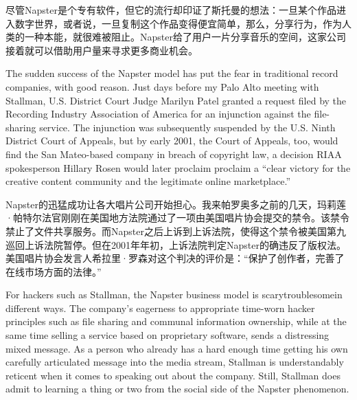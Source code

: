 \ifdefined\chs
尽管Napster是个专有软件，但它的流行却印证了斯托曼的想法：一旦某个作品进入数字世界，或者说，一旦复制这个作品变得便宜简单，那么，分享行为，作为人类的一种本能，就很难被阻止。Napster给了用户一片分享音乐的空间，这家公司接着就可以借助用户量来寻求更多商业机会。
\fi

\ifdefined\eng
The sudden success of the Napster model has put the fear in traditional record companies, with good reason. Just days before my Palo Alto meeting with Stallman, U.S. District Court Judge Marilyn Patel granted a request filed by the Recording Industry Association of America for an injunction against the file-sharing service. The injunction was subsequently suspended by the U.S. Ninth District Court of Appeals, but by early 2001, the Court of Appeals, too, would find the San Mateo-based company in breach of copyright law, a decision RIAA spokesperson Hillary Rosen would later proclaim \ifdefined\vone proclaim \fi a ``clear victory for the creative content community and the legitimate online marketplace.''
\fi

\ifdefined\chs
Napster的迅猛成功让各大唱片公司开始担心。我来帕罗奥多之前的几天，玛莉莲·帕特尔法官刚刚在美国地方法院通过了一项由美国唱片协会提交的禁令。该禁令禁止了文件共享服务。而Napster之后上诉到上诉法院，使得这个禁令被美国第九巡回上诉法院暂停。但在2001年年初，上诉法院判定Napster的确违反了版权法。美国唱片协会发言人希拉里·罗森对这个判决的评价是：``保护了创作者，完善了在线市场方面的法律。''
\fi

\ifdefined\eng
For hackers such as Stallman, the Napster business model is \ifdefined\vone scary\fi\ifdefined\vtwo troublesome\fi in different ways. The company's eagerness to appropriate time-worn hacker principles such as file sharing and communal information ownership, while at the same time selling a service based on proprietary software, sends a distressing mixed message. As a person who already has a hard enough time getting his own carefully articulated message into the media stream, Stallman is understandably reticent when it comes to speaking out about the company. Still, Stallman does admit to learning a thing or two from the social side of the Napster phenomenon.
\fi

